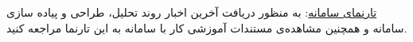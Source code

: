 \href{http://cmorgh.blog.ir/}{تارنمای سامانه}: 
به منظور دریافت آخرین اخبار روند تحلیل، طراحی و پیاده سازی سامانه و همچنین مشاهده‌ی مستندات آموزشی کار با سامانه به این تارنما مراجعه کنید.
